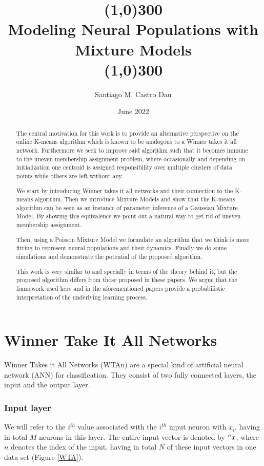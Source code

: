 \documentclass{article}
\title{\color{draculafg}\line(1,0){300}\\Modeling Neural Populations with Mixture Models\\\line(1,0){300}}
\author{\color{draculafg}Santiago M. Castro Dau}
\affil{Semester project for the Cortical Computation Group \\
	   Institute of Neuroinformatics,\\ University of Zürich and ETH Zürich}
\date{\color{draculafg}June 2022}
\begin{document}
\maketitle

\begin{abstract}
The central motivation for this work is to provide an alternative perspective on the
online K-means algorithm which is known to be analogous to a Winner takes it all
network. Furthermore we seek to improve said algorithm such that it becomes immune to the uneven
membership assignment problem, where occasionally and depending on
initialization one centroid is assigned responsibility over multiple
clusters of data points while others are left without any. 

We start by introducing Winner takes it all networks and their connection to the K-means algorithm. Then we introduce Mixture Models and show that the K-means algorithm can be seen as an instance of parameter
inference of a Gaussian Mixture Model. By showing this equivalence we point out a natural way to get rid of uneven
membership assignment. 

Then, using 
a Poisson Mixture Model we formulate an algorithm that we think is more fitting to represent neural populations and their dynamics. Finally we do some simulations and demonstrate the potential of the proposed algorithm. 

This work is very similar to \cite{Moraitis2021} and \cite{Keck2012} specially in terms of the theory
behind it, but the proposed algorithm differs from those proposed in
these papers. We argue that the framework used here and in the aforementioned papers provide a
probabilistic interpretation of the underlying learning process.

\end{abstract}

\pagebreak

\tableofcontents

\pagebreak

\section{Winner Take It All Networks}
Winner Takes it All Networks (WTAn) are a special kind of artificial neural network (ANN) for classification. They consist of two fully connected layers, the input and the output layer. 

\subsubsection*{Input layer}
We will refer to the \(i^{th}\) value associated with the \(i^{th}\) input neuron with \(x_i\), having in total \(M\) neurons in this layer. The entire input vector is denoted by \(\prescript{n}{}{x}\), where \(n\) denotes the index of the input, having in total \(N\) of these input vectors in one data set (Figure \ref{WTA}). 
\end{document}
